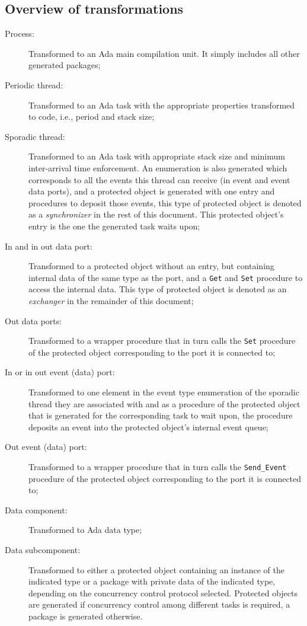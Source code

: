 \subsection{Overview of transformations}
\begin{description}
\item[Process:]{Transformed to an Ada main compilation unit. It simply
  includes all other generated packages;}
\item[Periodic thread:]{Transformed to an Ada task with the
  appropriate properties transformed to code, i.e., period and stack
  size;}
\item[Sporadic thread:]{Transformed to an Ada task with appropriate
  stack size and minimum inter-arrival time enforcement. An
  enumeration is also generated which corresponds to all the events
  this thread can receive (in event and event data ports), and a
  protected object is generated with one entry and procedures to
  deposit those events, this type of protected object is denoted as a
  \emph{synchronizer} in the rest of this document. This protected
  object's entry is the one the generated task waits upon;}
\item[In and in out data port:]{Transformed to a protected object
  without an entry, but containing internal data of the same type as
  the port, and a \texttt{Get} and \texttt{Set} procedure to access
  the internal data. This type of protected object is denoted as an
  \emph{exchanger} in the remainder of this document;}
\item[Out data ports:]{Transformed to a wrapper procedure that in turn
  calls the \texttt{Set} procedure of the protected object
  corresponding to the port it is connected to;}
\item[In or in out event (data) port:]{Transformed to one element in the
  event type enumeration of the sporadic thread they are associated
  with and as a procedure of the protected object that is generated
  for the corresponding task to wait upon, the procedure deposits an
  event into the protected object's internal event queue;}
\item[Out event (data) port:]{Transformed to a wrapper procedure that
  in turn calls the \texttt{Send\_Event} procedure of the protected
  object corresponding to the port it is connected to;}
\item[Data component:]{Transformed to Ada data type;}
\item[Data subcomponent:]{Transformed to either a protected object
  containing an instance of the indicated type or a package with
  private data of the indicated type, depending on the concurrency
  control protocol selected. Protected objects are generated if
  concurrency control among different tasks is required, a package is
  generated otherwise.}
\end{description}

